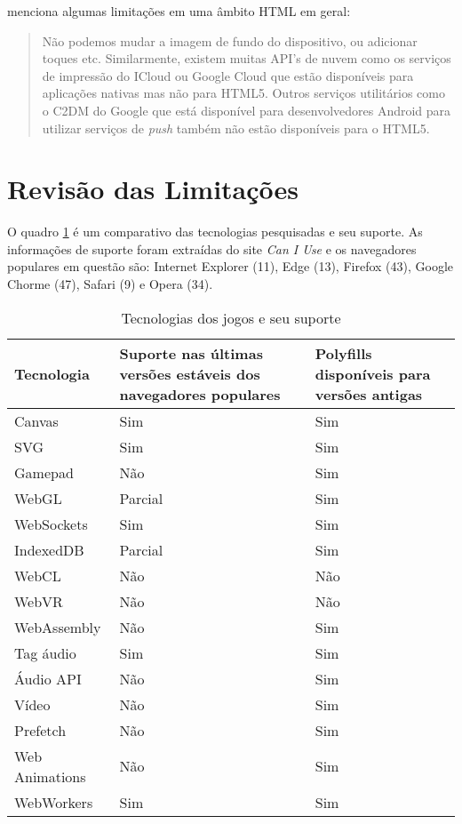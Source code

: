 \citet{html5Tradeoffs} menciona algumas limitações em uma âmbito HTML em geral:

\begin{quote}
Não podemos mudar a imagem de fundo do dispositivo, ou adicionar toques
etc. Similarmente, existem muitas API's de nuvem como os serviços
de impressão do ICloud ou Google Cloud que estão disponíveis para
aplicações nativas mas não para HTML5. Outros serviços utilitários
como o C2DM do Google que está disponível para desenvolvedores Android
para utilizar serviços de \textit{push} também não estão disponíveis
para o HTML5.
\end{quote}


\section{Revisão das Limitações}

O quadro \ref{table:technologies} é um comparativo das
tecnologias pesquisadas e seu suporte. As
informações de suporte foram extraídas do site \textit{Can I Use} e
os navegadores populares em questão são: Internet Explorer (11), Edge
(13), Firefox (43), Google Chorme (47), Safari (9) e Opera (34).

\begin{table}
\begin{tabular}{ |p{3cm}|p{3cm}|p{3cm}|  }
\hline
Tecnologia & Suporte nas últimas versões estáveis dos navegadores populares & Polyfills disponíveis  para versões antigas \\ \hline
Canvas & Sim & Sim \\ \hline
SVG & Sim & Sim \\ \hline
Gamepad & Não & Sim \\ \hline
WebGL & Parcial & Sim \\ \hline
WebSockets & Sim & Sim \\ \hline
IndexedDB & Parcial & Sim \\ \hline
WebCL & Não & Não \\ \hline
WebVR & Não & Não \\ \hline
WebAssembly & Não & Sim \\ \hline
Tag áudio & Sim & Sim \\ \hline
Áudio API & Não & Sim \\ \hline
Vídeo & Não & Sim \\ \hline
Prefetch & Não & Sim \\ \hline
Web Animations & Não & Sim \\ \hline
WebWorkers & Sim & Sim\\ \hline
\end{tabular}
\label{table:technologies}
\caption{Tecnologias dos jogos e seu suporte}
\end{table}

